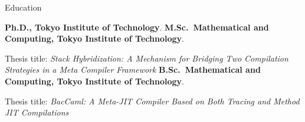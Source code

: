 \begin{rubric}{Education}

\entry*[2020-now]%
\textbf{Ph.D., Tokyo Institute of Technology}.
%
\entry*[2018-2020]%
\textbf{M.Sc.~Mathematical and Computing, Tokyo Institute of Technology}.\par
Thesis title: \textit{Stack Hybridization: A Mechanism for Bridging Two Compilation Strategies in a Meta Compiler Framework}
\entry*[2014-2018]%
\textbf{B.Sc.~Mathematical and Computing, Tokyo Institute of Technology}.\par
Thesis title: \textit{BacCaml: A Meta-JIT Compiler Based on Both Tracing and Method JIT Compilations}
\end{rubric}
